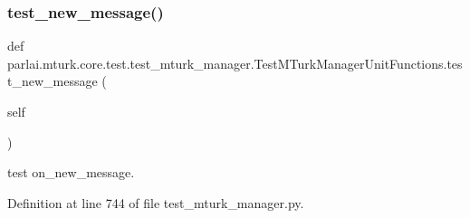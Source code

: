 \subsubsection{\texorpdfstring{test\+\_\+new\+\_\+message()}{test\_new\_message()}}
{\footnotesize\ttfamily def parlai.\+mturk.\+core.\+test.\+test\+\_\+mturk\+\_\+manager.\+Test\+M\+Turk\+Manager\+Unit\+Functions.\+test\+\_\+new\+\_\+message (\begin{DoxyParamCaption}\item[{}]{self }\end{DoxyParamCaption})}

\begin{DoxyVerb}test on_new_message.
\end{DoxyVerb}
 

Definition at line 744 of file test\+\_\+mturk\+\_\+manager.\+py.


